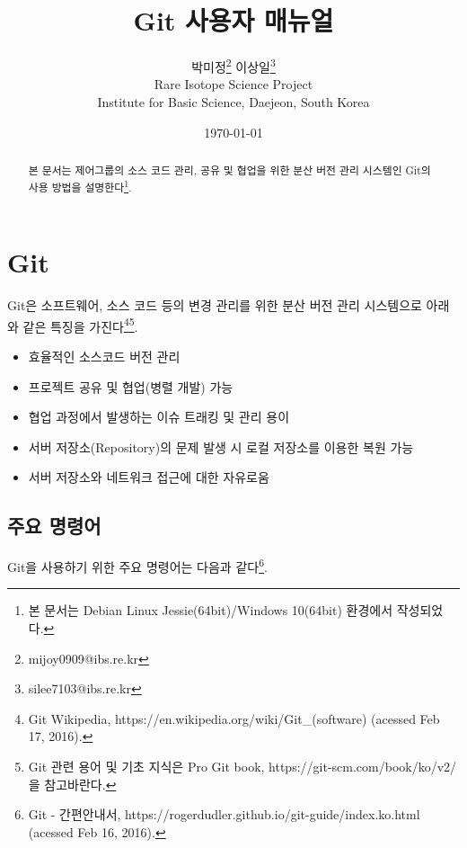 \documentclass[11pt
  , a4paper
  , article
  , oneside
]{memoir}
\begin{document}
 
\newcommand{\technumber}{
  RAON Control-Document Series\\
  Revision : v0.1,   Release : February. 15. 2016}
\title{\textbf{Git 사용자 매뉴얼}}

\author{박미정\thanks{mijoy0909@ibs.re.kr} {이상일\thanks{silee7103@ibs.re.kr}}\\
  Rare Isotope Science Project\\
  Institute for Basic Science, Daejeon, South Korea
}
\date{\today}


\renewcommand{\maketitlehooka}{\begin{flushright}\textsf{\technumber}\end{flushright}}

\maketitle

\begin{abstract}
본 문서는 제어그룹의 소스 코드 관리, 공유 및 협업을 위한 분산 버전 관리 시스템인 Git의 사용 방법을 설명한다\footnote{본 문서는 Debian Linux Jessie(64bit)/Windows 10(64bit) 환경에서 작성되었다.}.
\end{abstract}


\chapter{Git}
Git은 소프트웨어, 소스 코드 등의 변경 관리를 위한 분산 버전 관리 시스템으로 아래와 같은 특징을 가진다\footnote{Git Wikipedia, https://en.wikipedia.org/wiki/Git\_(software) (acessed Feb 17, 2016).}\footnote{Git 관련 용어 및 기초 지식은 Pro Git book, https://git-scm.com/book/ko/v2/을 참고바란다.}.

\begin{itemize}
	\item 효율적인 소스코드 버전 관리
	\item 프로젝트 공유 및 협업(병렬 개발) 가능
	\item 협업 과정에서 발생하는 이슈 트래킹 및 관리 용이
	\item 서버 저장소(Repository)의 문제 발생 시 로컬 저장소를 이용한 복원 가능
	\item 서버 저장소와 네트워크 접근에 대한 자유로움
\end{itemize}

\section{주요 명령어}
Git을 사용하기 위한 주요 명령어는 다음과 같다\footnote{Git - 간편안내서, https://rogerdudler.github.io/git-guide/index.ko.html (acessed Feb 16, 2016).}.
\end{document}
